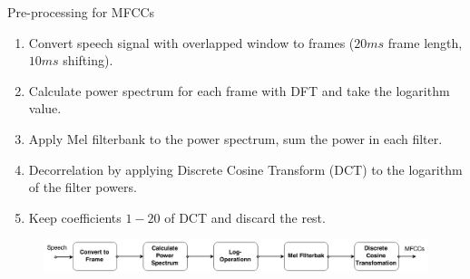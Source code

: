 	
	\begin{frame}[t]{Pre-processing for MFCCs}
		      \begin{enumerate}
		      \item Convert speech signal with overlapped window to frames ($20ms$ frame length, $10ms$ shifting).
		      \item Calculate power spectrum for each frame with DFT and take the logarithm value.
		      \item Apply Mel filterbank to the power spectrum, sum the power in each filter.
		      \item Decorrelation by applying Discrete Cosine Transform (DCT) to the logarithm of the filter powers.
		      \item Keep coefficients $1-20$ of DCT and discard the rest.
		      \end{enumerate}

		      \begin{figure}[htbp]
		      \includegraphics[width= \textwidth]{mfcc.png}
		      \end{figure}
	\end{frame}
	
